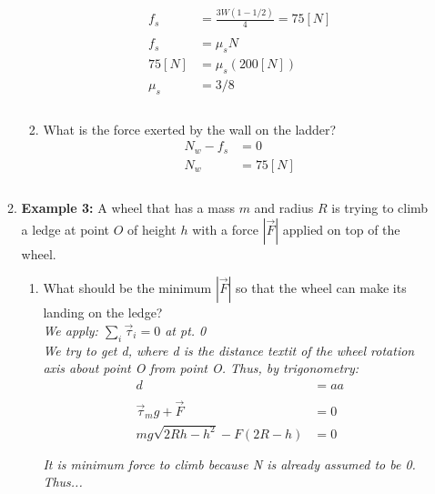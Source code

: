 \documentclass{article}
\begin{document}
\begin{enumerate}
\begin{enumerate}
\begin{enumerate}
\begin{align*}
                        f_s&=\frac{3W(1-1/2)}{4}=75[N] \\
                        \\
                        f_s&=\mu_sN \\
                        75[N]&=\mu_s(200[N]) \\
                        \mu_s&=3/8 \\
                        \\
                    \end{align*} 
                    \item What is the force exerted by the wall on the ladder?
                    \begin{align*}
                        N_w-f_s&=0 \\
                        N_w&=75[N] \\
                        \\
                    \end{align*}
                \end{enumerate}
                \item \textbf{Example 3:}
                A wheel that has a mass $m$ and radius $R$ is trying to climb a ledge at point $O$ of height $h$ with a force $|\vec{F}|$ applied on top of the wheel. 
                \begin{enumerate}
                    \item What should be the minimum $|\vec{F}|$ so that the wheel can make its landing on the ledge?
                    \\
                    \textit{We apply: $\sum_i\vec{\tau}_i=0$ at pt. 0} \\
                    \textit{We try to get d, where d is the distance textit of the wheel rotation axis about point O from point O. Thus, by trigonometry:} \\
                    \begin{align*}
                        d&=aa \\
                        \\
                        \vec{\tau}_mg+\vec{F}&=0 \\
                        mg\sqrt{2Rh-h^2}-F(2R-h)&=0 \\
                        \\
                    \end{align*}
                    \textit{It is minimum force to climb because N is already assumed to be 0. Thus...} \\

\end{enumerate}
\end{enumerate}
\end{enumerate}
\end{document}
